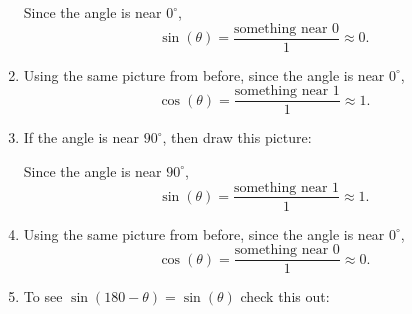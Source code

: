 \documentclass[noauthor,nooutcomes,12pt]{ximera}
\begin{document}
\begin{question}
\begin{freeResponse}
\begin{enumerate}
\begin{center}
\begin{tikzpicture}[geometryDiagrams]
        
        
      \end{tikzpicture}
      \end{center}
      Since the angle is near $0^\circ$,
      \[
      \sin(\theta) = \frac{\text{something near $0$}}{1} \approx 0.
      \]
    \item Using the same picture from before, since the angle is near $0^\circ$,
      \[
      \cos(\theta) = \frac{\text{something near $1$}}{1} \approx 1.
      \]
    \item If the angle is near $90^\circ$, then draw this picture:
      \begin{center}
      \end{center}
      Since the angle is near $90^\circ$,
      \[
      \sin(\theta) = \frac{\text{something near $1$}}{1} \approx 1.
      \]
     \item Using the same picture from before, since the angle is near $0^\circ$,
      \[
      \cos(\theta) = \frac{\text{something near $0$}}{1} \approx 0.
      \]
    \item To see $\sin(180-\theta)=\sin(\theta)$ check this out:
      \begin{center}
\end{center}
\end{enumerate}
\end{freeResponse}
\end{question}
\end{document}
